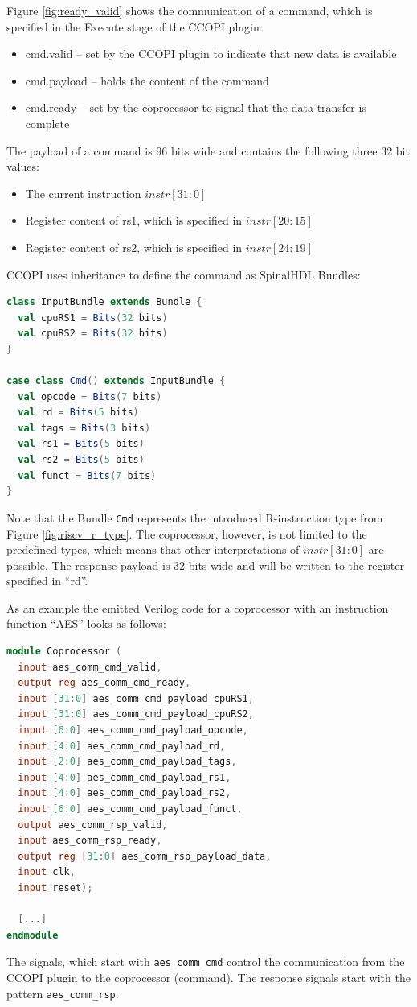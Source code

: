 \documentclass[twoside,twocolumn]{article}
\newcommand{\code}[1]{\texttt{#1}}
\begin{document}
\noindent Figure \ref*{fig:ready_valid} shows the communication of a command,
which is specified in the Execute stage of the CCOPI plugin:
\begin{itemize}
    \item cmd.valid -- set by the CCOPI plugin to indicate that new data
        is available
    \item cmd.payload -- holds the content of the command
    \item cmd.ready -- set by the coprocessor to signal that the data
        transfer is complete
\end{itemize}
The payload of a command is 96 bits wide and contains the following
three 32 bit values:
\begin{itemize}
    \item The current instruction $instr[31:0]$
    \item Register content of rs1, which is specified in $instr[20:15]$
    \item Register content of rs2, which is specified in $instr[24:19]$
\end{itemize}
CCOPI uses inheritance to define the command as SpinalHDL Bundles:
\begin{lstlisting}[language=scala]
class InputBundle extends Bundle {
  val cpuRS1 = Bits(32 bits)
  val cpuRS2 = Bits(32 bits)
}

case class Cmd() extends InputBundle {
  val opcode = Bits(7 bits)
  val rd = Bits(5 bits)
  val tags = Bits(3 bits)
  val rs1 = Bits(5 bits)
  val rs2 = Bits(5 bits)
  val funct = Bits(7 bits)
}
\end{lstlisting}
Note that the Bundle \code{Cmd} represents the introduced R-instruction
type from Figure \ref*{fig:riscv_r_type}. The coprocessor,
however, is not limited to the predefined types, which means
that other interpretations of $instr[31:0]$ are possible.
The response payload is 32 bits wide and will be written to the register
specified in ``rd''.

As an example the emitted Verilog code for a coprocessor with an instruction 
function ``AES'' looks as follows:
\begin{lstlisting}[language=Verilog]
module Coprocessor (
  input aes_comm_cmd_valid,
  output reg aes_comm_cmd_ready,
  input [31:0] aes_comm_cmd_payload_cpuRS1,
  input [31:0] aes_comm_cmd_payload_cpuRS2,
  input [6:0] aes_comm_cmd_payload_opcode,
  input [4:0] aes_comm_cmd_payload_rd,
  input [2:0] aes_comm_cmd_payload_tags,
  input [4:0] aes_comm_cmd_payload_rs1,
  input [4:0] aes_comm_cmd_payload_rs2,
  input [6:0] aes_comm_cmd_payload_funct,
  output aes_comm_rsp_valid,
  input aes_comm_rsp_ready,
  output reg [31:0] aes_comm_rsp_payload_data,
  input clk,
  input reset);

  [...]
endmodule
\end{lstlisting}
The signals, which start with \code{aes\_comm\_cmd} control the
communication from the CCOPI plugin to the coprocessor (command). The
response signals start with the pattern \code{aes\_comm\_rsp}.
\end{document}

